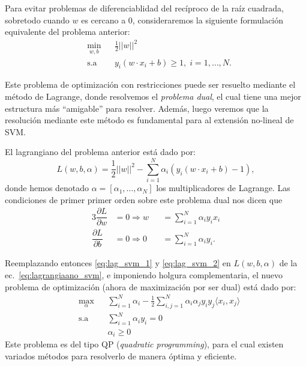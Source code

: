 Para evitar problemas de diferenciablidad del recíproco de la raíz cuadrada, sobretodo cuando $w$ es cercano a 0, consideraremos la siguiente formulación equivalente del problema anterior:
\begin{equation*}
\begin{aligned}
& \underset{w,b}{\text{min}}
& & \frac{1}{2}||w||^2\\
& \text{s.a}
& & y_i (w\cdot x_i +b) \geq 1, \; i = 1, \ldots, N.
\end{aligned}
\end{equation*}

Este problema de optimización con restricciones puede ser resuelto mediante el método de Lagrange, donde resolvemos el \emph{problema dual}, el cual tiene una mejor estructura más ``amigable'' para resolver. Además, luego veremos que la resolución mediante este método es fundamental para al extensión no-lineal de SVM.

El lagrangiano del problema anterior está dado por:
\begin{equation}
    L(w,b,\alpha) = \frac{1}{2}||w||^2 - \sum\limits_{i=1}^{N} \alpha_i (y_i (w\cdot x_i +b) -1),\label{eq:lagrangiaano_svm}
\end{equation}
donde hemos denotado $\alpha = [\alpha_1,\ldots,\alpha_N]$ los multiplicadores de Lagrange. Las condiciones de primer primer orden sobre este problema dual nos dicen que
\begin{alignat}{3}
    \dfrac{\partial L}{\partial w} &= 0 \Rightarrow w &&= \sum\limits_{i=1}^{N} \alpha_i y_i x_i \label{eq:lag_svm_1}\\
    \dfrac{\partial L}{\partial b} &= 0 \Rightarrow 0 &&=\sum\limits_{i=1}^{N} \alpha_i y_i.  \label{eq:lag_svm_2}
\end{alignat}


Reemplazando entonces \eqref{eq:lag_svm_1} y \eqref{eq:lag_svm_2} en $L(w,b, \alpha)$ de la ec.~\eqref{eq:lagrangiaano_svm},  e imponiendo holgura complementaria, el nuevo problema de optimización (ahora de maximización por ser dual) está dado por: 
\begin{equation*}
\begin{aligned}
& \underset{\alpha}{\text{max}}
& & \sum\limits_{i=1}^{N}\alpha_i - \frac{1}{2} \sum\limits_{i,j=1}^{N} \alpha_i \alpha_j y_i y_j \langle x_i, x_j\rangle\\
& \text{s.a}
& & \sum\limits_{i=1}^{N} \alpha_i y_i= 0 \\
& &  &\alpha_i \geq 0
\end{aligned}
\end{equation*}
Este problema es del tipo QP (\emph{quadratic programming}), para el cual existen variados métodos para resolverlo de manera óptima y eficiente. 

